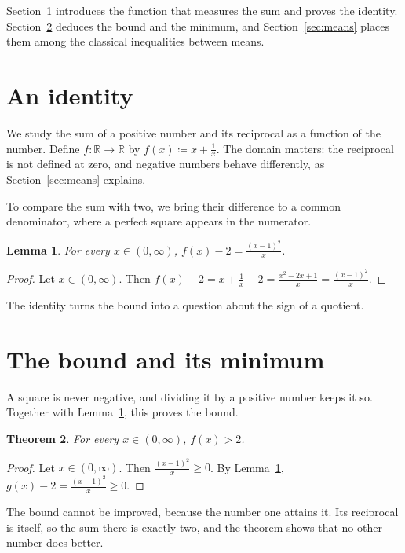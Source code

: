 \documentclass{article}
\newtheorem{lemma}{Lemma}[section]
\newtheorem{theorem}[lemma]{Theorem}
\begin{document}
Section~\ref{sec:identity} introduces the function that measures the sum and proves the identity.
Section~\ref{sec:bound} deduces the bound and the minimum, and Section~\ref{sec:means} places them among the classical inequalities between means.

\section{An identity}\label{sec:identity}

We study the sum of a positive number and its reciprocal as a function of the number.
Define $f:\mathbb{R}\to\mathbb{R}$ by $f(x)\coloneqq x+\frac1x$.
The domain matters: the reciprocal is not defined at zero, and negative numbers behave differently, as Section~\ref{sec:means} explains.

To compare the sum with two, we bring their difference to a common denominator, where a perfect square appears in the numerator.

\begin{lemma}\label{lem:identity}
For every $x\in(0,\infty)$, $f(x)-2=\frac{(x-1)^2}{x}$.
\end{lemma}

\begin{proof}
Let $x\in(0,\infty)$.
Then $f(x)-2=x+\frac1x-2=\frac{x^2-2x+1}{x}=\frac{(x-1)^2}{x}$.
\end{proof}

The identity turns the bound into a question about the sign of a quotient.

\section{The bound and its minimum}\label{sec:bound}

A square is never negative, and dividing it by a positive number keeps it so.
Together with Lemma~\ref{lem:identity}, this proves the bound.

\begin{theorem}\label{thm:bound}
For every $x\in(0,\infty)$, $f(x)>2$.
\end{theorem}

\begin{proof}
Let $x\in(0,\infty)$.
Then $\frac{(x-1)^2}{x}\ge0$.
By Lemma~\ref{lem:identity}, $g(x)-2=\frac{(x-1)^2}{x}\ge0$.
\end{proof}

The bound cannot be improved, because the number one attains it.
Its reciprocal is itself, so the sum there is exactly two, and the theorem shows that no other number does better.
\end{document}
